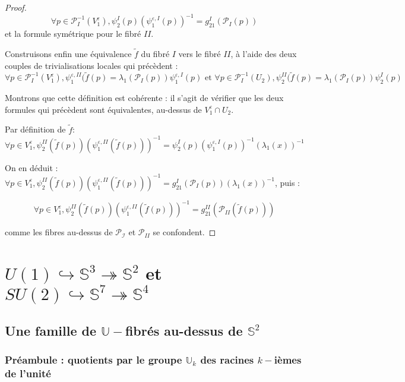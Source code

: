 \begin{proof}
\[\forall p \in \mathcal{P}_I^{-1}(V_1^{\varepsilon}) , \psi_2^I(p) (\psi_1^{\varepsilon , I}(p))^{-1} = g_{21}^I(\mathcal{P}_I(p))\]
et la formule symétrique pour le fibré $II$.

\par
Construisons enfin une équivalence $\tilde{f}$ du fibré $I$ vers le fibré $II$, à l'aide des deux couples de trivialisations locales qui précèdent :
\[\forall p \in \mathcal{P}_I^{-1}(V_1^{\varepsilon}) , \psi_1^{\varepsilon , II}(\tilde{f}(p) = \lambda_1(\mathcal{P}_I(p)) \psi_1^{\varepsilon , I}(p)%
\text{ et }%
\forall p \in \mathcal{P}_I^{-1}(U_2) , \psi_2^{II}(\tilde{f}(p) = \lambda_1(\mathcal{P}_I(p)) \psi_2^I(p)\]

Montrons que cette définition est cohérente : il s'agit de vérifier que les deux formules qui précèdent sont équivalentes, au-dessus de $V_1^{\varepsilon} \cap U_2$.

\par
Par définition de $\tilde{f}$:
\[\forall p \in V_1^{\varepsilon} , \psi_2^{II}(\tilde{f}(p))(\psi_1^{\varepsilon , II}(\tilde{f}(p)))^{-1} = \psi_2^I(p) (\psi_1^{\varepsilon , I}(p))^{-1} (\lambda_1(x))^{-1}\]

On en déduit : $\forall p \in V_1^{\varepsilon} , \psi_2^{II}(\tilde{f}(p))(\psi_1^{\varepsilon , II}(\tilde{f}(p)))^{-1} = g_{21}^I(\mathcal{P}_I(p))(\lambda_1(x))^{-1}$, puis :

\[\forall p \in V_1^{\varepsilon} , \psi_2^{II}(\tilde{f}(p))(\psi_1^{\varepsilon , II}(\tilde{f}(p)))^{-1} = g_{21}^{II}(\mathcal{P}_{II}(\tilde{f}(p)))\]

comme les fibres au-dessus de $\mathcal{P_I}$ et $\mathcal{P}_{II}$ se confondent.
\end{proof}

\section{$U(1)\hookrightarrow\mathbb{S}^3\twoheadrightarrow\mathbb{S}^2$ et $SU(2)\hookrightarrow\mathbb{S}^7\twoheadrightarrow\mathbb{S}^4$}

\subsection{Une famille de $\mathbb{U}-$fibr\'es au-dessus de $\mathbb{S}^2$}

\subsubsection{Pr\'eambule : quotients par le groupe $\mathbb{U}_k$ des racines $k-$i\`emes de l'unit\'e}\label{ltk}

